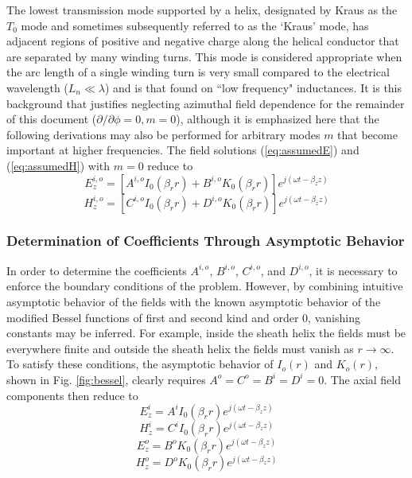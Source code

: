 The lowest transmission mode supported by a helix, designated by Kraus as the $T_0$ mode and sometimes subsequently referred to as the `Kraus' mode, has adjacent regions of positive and negative charge along the helical conductor that are separated by many winding turns. This mode is considered appropriate when the arc length of a single winding turn is very small compared to the electrical wavelength ($L_n \ll \lambda$) and is that found on ``low frequency" inductances. It is this background that justifies neglecting azimuthal field dependence for the remainder of this document ($\partial/\partial\phi=0, m=0$), although it is emphasized here that the following derivations may also be performed for arbitrary modes $m$ that become important at higher frequencies. The field solutions (\ref{eq:assumedE}) and (\ref{eq:assumedH}) with $m=0$ reduce to
\begin{equation}\label{eq:assumedEt0}
	E_{z}^{i,o} = [A^{i,o}I_{0}(\beta_{r}r) + B^{i,o}K_{0}(\beta_{r}r)]e^{j(\omega t - \beta_{z}z)}
\end{equation}
\begin{equation}\label{eq:assumedHt0}
	H_{z}^{i,o} = [C^{i,o}I_{0}(\beta_{r}r) + D^{i,o}K_{0}(\beta_{r}r)]e^{j(\omega t - \beta_{z}z)}
\end{equation}


\subsubsection{Determination of Coefficients Through Asymptotic Behavior}\label{subsubsec:asymptotic}
In order to determine the coefficients $A^{i,o}$, $B^{i,o}$, $C^{i,o}$, and $D^{i,o}$, it is necessary to enforce the boundary conditions of the problem. However, by combining intuitive asymptotic behavior of the fields with the known asymptotic behavior of the modified Bessel functions of first and second kind and order 0, vanishing constants may be inferred. For example, inside the sheath helix the fields must be everywhere finite   and outside the sheath helix the fields must vanish as $r\rightarrow\infty$. To satisfy these conditions, the asymptotic behavior of $I_o(r)$ and $K_o(r)$, shown in Fig. \ref{fig:bessel}, clearly requires $A^o=C^o=B^i=D^i=0$. The axial field components then reduce to 
\begin{equation}\label{eq:Ezi}
	E_{z}^{i} = A^{i}I_{0}(\beta_{r}r)e^{j(\omega t - \beta_{z}z)}
\end{equation}
\begin{equation}\label{eq:Hzi}
	H_{z}^{i} = C^{i}I_{0}(\beta_{r}r)e^{j(\omega t - \beta_{z}z)}
\end{equation}
\begin{equation}\label{eq:Ezo}
	E_{z}^{o} = B^{o}K_{0}(\beta_{r}r)e^{j(\omega t - \beta_{z}z)}
\end{equation}
\begin{equation}\label{eq:Hzo}
	H_{z}^{o} = D^{o}K_{0}(\beta_{r}r)e^{j(\omega t - \beta_{z}z)}
\end{equation}
